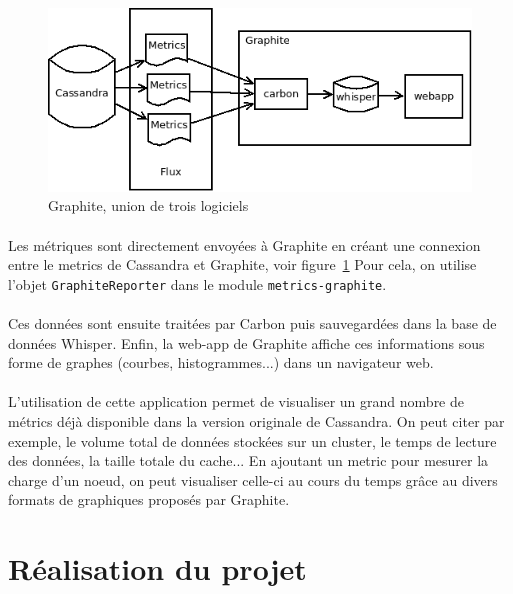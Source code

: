 \documentclass[12pt]{article}
\newcommand{\class}[1]{\texttt{#1}}
\begin{document}
\begin{figure}[h]
	\centering
		\includegraphics[width=12cm]{images/client/graphite.png}
	\caption{Graphite, union de trois logiciels \label{fig:client_visu}}
\end{figure}


\paragraph{} Les métriques sont directement envoyées à Graphite en créant une connexion entre le metrics de Cassandra et Graphite, voir figure~\ref{fig:client_visu}
Pour cela, on utilise l'objet \class{GraphiteReporter} dans le module \class{metrics-graphite}.

\paragraph{} Ces données sont ensuite traitées par Carbon puis sauvegardées dans la base de données Whisper.
Enfin, la web-app de Graphite affiche ces informations sous forme de graphes (courbes, histogrammes...) dans un navigateur web.

\paragraph{} L'utilisation de cette application permet de visualiser un grand nombre de métrics déjà disponible dans la version originale de Cassandra.
On peut citer par exemple, le volume total de données stockées sur un cluster, le temps de lecture des données, la taille totale du cache...
En ajoutant un metric pour mesurer la charge d'un noeud, on peut visualiser celle-ci au cours du temps grâce au divers formats de graphiques proposés par Graphite.


\newpage 
\section{Réalisation du projet}
\end{document}
